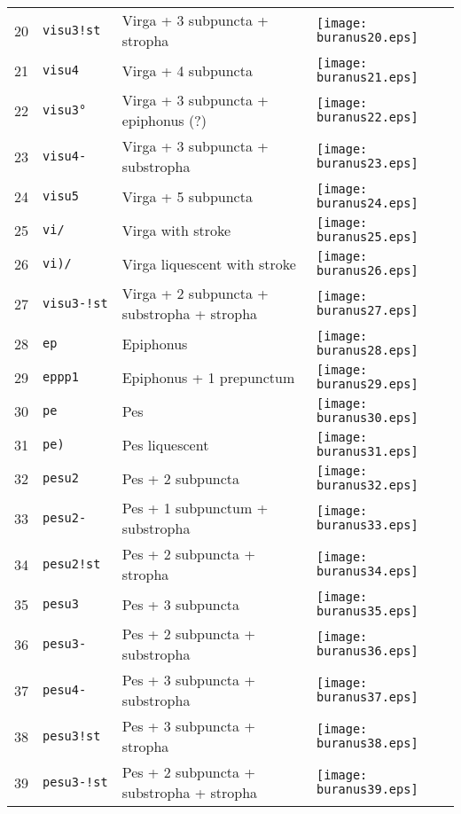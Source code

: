 \documentclass{scrarticle}
\begin{document}
\begin{longtable}{l|l|l|l}
20 & \texttt{visu3!st} & Virga + 3 subpuncta + stropha & \texttt{[image: buranus20.eps]} \\
21 & \texttt{visu4} & Virga + 4 subpuncta & \texttt{[image: buranus21.eps]} \\
22 & \texttt{visu3°} & Virga + 3 subpuncta + epiphonus (?) & \texttt{[image: buranus22.eps]} \\
23 & \texttt{visu4-} & Virga + 3 subpuncta + substropha & \texttt{[image: buranus23.eps]} \\
24 & \texttt{visu5} & Virga + 5 subpuncta & \texttt{[image: buranus24.eps]} \\
25 & \texttt{vi/} & Virga with stroke & \texttt{[image: buranus25.eps]} \\
26 & \texttt{vi)/} & Virga liquescent with stroke & \texttt{[image: buranus26.eps]} \\
27 & \texttt{visu3-!st} & Virga + 2 subpuncta + substropha + stropha & \texttt{[image: buranus27.eps]} \\
28 & \texttt{ep} & Epiphonus & \texttt{[image: buranus28.eps]} \\
29 & \texttt{eppp1} & Epiphonus + 1 prepunctum & \texttt{[image: buranus29.eps]} \\
30 & \texttt{pe} & Pes & \texttt{[image: buranus30.eps]} \\
31 & \texttt{pe)} & Pes liquescent & \texttt{[image: buranus31.eps]} \\
32 & \texttt{pesu2} & Pes + 2 subpuncta & \texttt{[image: buranus32.eps]} \\
33 & \texttt{pesu2-} & Pes + 1 subpunctum + substropha & \texttt{[image: buranus33.eps]} \\
34 & \texttt{pesu2!st} & Pes + 2 subpuncta + stropha & \texttt{[image: buranus34.eps]} \\
35 & \texttt{pesu3} & Pes + 3 subpuncta & \texttt{[image: buranus35.eps]} \\
36 & \texttt{pesu3-} & Pes + 2 subpuncta + substropha & \texttt{[image: buranus36.eps]} \\
37 & \texttt{pesu4-} & Pes + 3 subpuncta + substropha & \texttt{[image: buranus37.eps]} \\
38 & \texttt{pesu3!st} & Pes + 3 subpuncta + stropha & \texttt{[image: buranus38.eps]} \\
39 & \texttt{pesu3-!st} & Pes + 2 subpuncta + substropha + stropha & \texttt{[image: buranus39.eps]} \\

\end{longtable}
\end{document}
